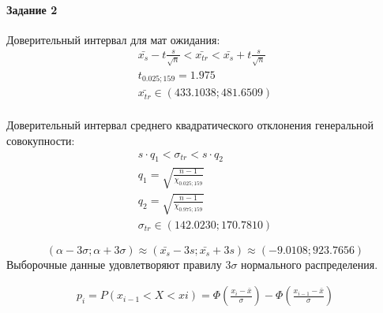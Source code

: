 \paragraph{Задание 2}

Доверительный интервал для мат ожидания:
\begin{gather*}
    \bar{x_{s}} - t\frac{s}{\sqrt{n}} < \bar{x_{tr}} < \bar{x_{s}} + t\frac{s}{\sqrt{n}}\\
    t_{0.025;159} = 1.975\\
    \bar{x_{tr}} \in (433.1038; 481.6509)\\
\end{gather*}

Доверительный интервал среднего квадратического отклонения генеральной совокупности:
\begin{gather*}
    s \cdot q_{1} < \sigma_{tr} < s \cdot q_{2}\\
    q_{1} = \sqrt{\frac{n - 1}{\chi_{0.025;159}}}\\
    q_{2} = \sqrt{\frac{n - 1}{\chi_{0.975;159}}}\\
    \sigma_{tr} \in (142.0230; 170.7810)
\end{gather*}


\[(\alpha - 3\sigma; \alpha + 3\sigma) \approx (\bar{x_s} - 3s; \bar{x_s} + 3s) \approx (-9.0108; 923.7656)\]
Выборочные данные удовлетворяют правилу $3\sigma$ нормального распределения.


\begin{gather*}
    p_{i} = P(x_{i-1} < X < x{i}) = \Phi(\frac{x_{i} - \bar{x}}{\sigma}) - \Phi(\frac{x_{i - 1} - \bar{x}}{\sigma})
\end{gather*}

